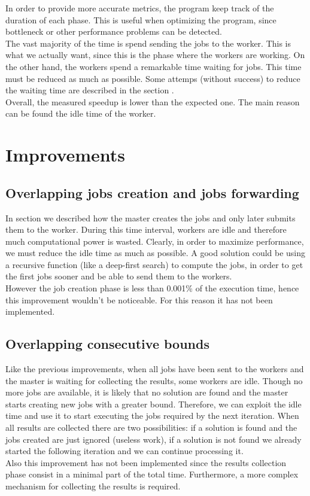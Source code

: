 \documentclass{article}
\begin{document}
In order to provide more accurate metrics, the program keep track of the duration of each phase. This is useful when optimizing the program, since bottleneck or other performance problems can be detected. \\
The vast majority of the time is spend sending the jobs to the worker. This is what we actually want, since this is the phase where the workers are working. On the other hand, the workers spend a remarkable time waiting for jobs. This time must be reduced as much as possible. Some attemps (without success) to reduce the waiting time are described in the section . \\
Overall, the measured speedup is lower than the expected one. The main reason can be found the idle time of the worker.

\section{Improvements} \label{sec:improvements}

\subsection{Overlapping jobs creation and jobs forwarding}
In section  we described how the master creates the jobs and only later submits them to the worker. During this time interval, workers are idle and therefore much computational power is wasted. Clearly, in order to maximize performance, we must reduce the idle time as much as possible. A good solution could be using a recursive function (like a deep-first search) to compute the jobs, in order to get the first jobs sooner and be able to send them to the workers. \\
However the job creation phase is less than 0.001\% of the execution time, hence this improvement wouldn't be noticeable. For this reason it has not been implemented.


\subsection{Overlapping consecutive bounds}
Like the previous improvements, when all jobs have been sent to the workers and the master is waiting for collecting the results, some workers are idle. Though no more jobs are available, it is likely that no solution are found and the master starts creating new jobs with a greater bound. Therefore, we can exploit the idle time and use it to start executing the jobs required by the next iteration. When all results are collected there are two possibilities: if a solution is found and the jobs created are just ignored (useless work), if a solution is not found we already started the following iteration and we can continue processing it. \\
Also this improvement has not been implemented since the results collection phase consist in a minimal part of the total time. Furthermore, a more complex mechanism for collecting the results is required.
\end{document}
